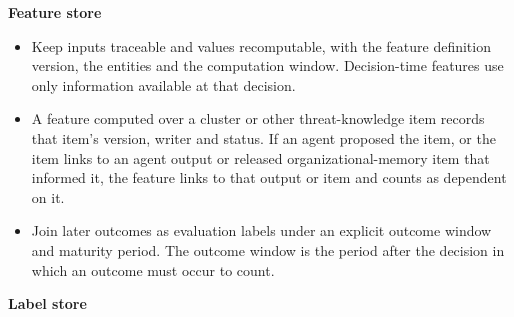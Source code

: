 \documentclass[
  11pt,
]{article}
\providecommand{\tightlist}{%
  \setlength{\itemsep}{0pt}\setlength{\parskip}{0pt}}
\renewcommand{\tightlist}{\setlength{\itemsep}{0pt plus 1pt}\setlength{\parskip}{0pt}}
\begin{document}

\textbf{Feature store}

\begin{itemize}
\tightlist
\item
  Keep inputs traceable and values recomputable, with the feature
  definition version, the entities and the computation window.
  Decision-time features use only information available at that
  decision.
\item
  A feature computed over a cluster or other threat-knowledge item
  records that item's version, writer and status. If an agent proposed
  the item, or the item links to an agent output or released
  organizational-memory item that informed it, the feature links to that
  output or item and counts as dependent on it.
\item
  Join later outcomes as evaluation labels under an explicit outcome
  window and maturity period. The outcome window is the period after the
  decision in which an outcome must occur to count.
\end{itemize}


\textbf{Label store}
\end{document}
